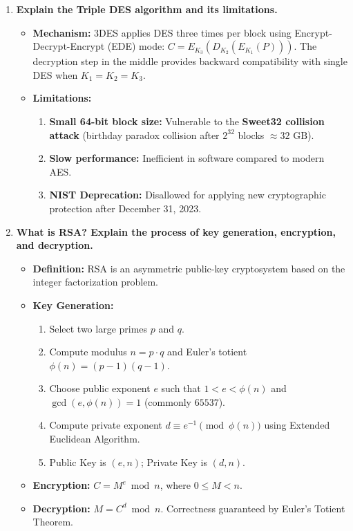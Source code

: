 \begin{enumerate}[label=\textbf{Q\arabic*.},leftmargin=1.2cm]
\item \textbf{Explain the Triple DES algorithm and its limitations.}
\begin{itemize}
\item \textbf{Mechanism:} 3DES applies DES three times per block using Encrypt-Decrypt-Encrypt (EDE) mode: $C = E_{K_3}(D_{K_2}(E_{K_1}(P)))$. The decryption step in the middle provides backward compatibility with single DES when $K_1 = K_2 = K_3$.
\item \textbf{Limitations:}
\begin{enumerate}
\item \textbf{Small 64-bit block size:} Vulnerable to the \textbf{Sweet32 collision attack} (birthday paradox collision after $2^{32}$ blocks $\approx 32\text{ GB}$).
\item \textbf{Slow performance:} Inefficient in software compared to modern AES.
\item \textbf{NIST Deprecation:} Disallowed for applying new cryptographic protection after December 31, 2023.
\end{enumerate}
\end{itemize}

\item \textbf{What is RSA? Explain the process of key generation, encryption, and decryption.}
\begin{itemize}
\item \textbf{Definition:} RSA is an asymmetric public-key cryptosystem based on the integer factorization problem.
\item \textbf{Key Generation:}
\begin{enumerate}
\item Select two large primes $p$ and $q$.
\item Compute modulus $n = p \cdot q$ and Euler's totient $\phi(n) = (p-1)(q-1)$.
\item Choose public exponent $e$ such that $1 < e < \phi(n)$ and $\gcd(e, \phi(n)) = 1$ (commonly $65537$).
\item Compute private exponent $d \equiv e^{-1} \pmod{\phi(n)}$ using Extended Euclidean Algorithm.
\item Public Key is $(e, n)$; Private Key is $(d, n)$.
\end{enumerate}
\item \textbf{Encryption:} $C = M^e \bmod n$, where $0 \le M < n$.
\item \textbf{Decryption:} $M = C^d \bmod n$. Correctness guaranteed by Euler's Totient Theorem.
\end{itemize}


\end{enumerate}
